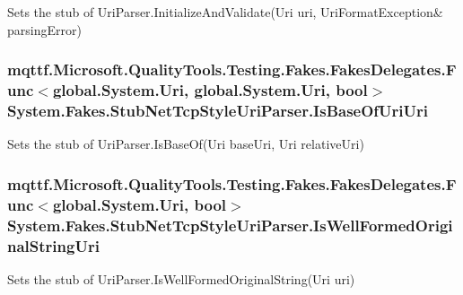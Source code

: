 Sets the stub of Uri\-Parser.\-Initialize\-And\-Validate(Uri uri, Uri\-Format\-Exception\& parsing\-Error)

\hypertarget{class_system_1_1_fakes_1_1_stub_net_tcp_style_uri_parser_acd04f9638297a705e0f5a03aac45bc8b}{
\subsubsection[{Is\-Base\-Of\-Uri\-Uri}]{\setlength{\rightskip}{0pt plus 5cm}mqttf.\-Microsoft.\-Quality\-Tools.\-Testing.\-Fakes.\-Fakes\-Delegates.\-Func$<$global.\-System.\-Uri, global.\-System.\-Uri, bool$>$ System.\-Fakes.\-Stub\-Net\-Tcp\-Style\-Uri\-Parser.\-Is\-Base\-Of\-Uri\-Uri}}\label{class_system_1_1_fakes_1_1_stub_net_tcp_style_uri_parser_acd04f9638297a705e0f5a03aac45bc8b}


Sets the stub of Uri\-Parser.\-Is\-Base\-Of(\-Uri base\-Uri, Uri relative\-Uri)

\hypertarget{class_system_1_1_fakes_1_1_stub_net_tcp_style_uri_parser_a8817dec17d50428d0190d2bd4fa962c5}{
\subsubsection[{Is\-Well\-Formed\-Original\-String\-Uri}]{\setlength{\rightskip}{0pt plus 5cm}mqttf.\-Microsoft.\-Quality\-Tools.\-Testing.\-Fakes.\-Fakes\-Delegates.\-Func$<$global.\-System.\-Uri, bool$>$ System.\-Fakes.\-Stub\-Net\-Tcp\-Style\-Uri\-Parser.\-Is\-Well\-Formed\-Original\-String\-Uri}}\label{class_system_1_1_fakes_1_1_stub_net_tcp_style_uri_parser_a8817dec17d50428d0190d2bd4fa962c5}


Sets the stub of Uri\-Parser.\-Is\-Well\-Formed\-Original\-String(\-Uri uri)

